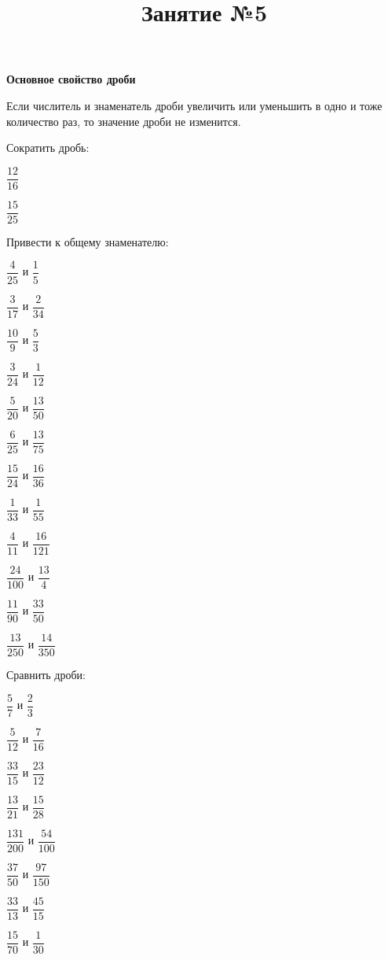 %
\newpage
\title{Занятие №5}
\begin{listofex}
	\item \textbf{Основное свойство дроби}
	
	Если числитель и знаменатель дроби увеличить или уменьшить в одно и тоже количество раз, то значение дроби не изменится.
	\item Сократить дробь:
	\begin{enumcols}[itemcolumns=4]
		\item \( \dfrac{12}{16} \)
		\item \( \dfrac{15}{25} \)
	\end{enumcols}
	\item Привести к общему знаменателю:
	\begin{enumcols}[itemcolumns=4]
		\item \( \dfrac{4}{25} \) и \( \dfrac{1}{5} \)
		\item \( \dfrac{3}{17} \) и \( \dfrac{2}{34} \)
		\item \( \dfrac{10}{9} \) и \( \dfrac{5}{3} \)
		\item \( \dfrac{3}{24} \) и \( \dfrac{1}{12} \)
		\item \( \dfrac{5}{20} \) и \( \dfrac{13}{50} \)
		\item \( \dfrac{6}{25} \) и \( \dfrac{13}{75} \)
		\item \( \dfrac{15}{24} \) и \( \dfrac{16}{36} \)
		\item \( \dfrac{1}{33} \) и \( \dfrac{1}{55} \)
		\item \( \dfrac{4}{11} \) и \( \dfrac{16}{121} \)
		\item \( \dfrac{24}{100} \) и \( \dfrac{13}{4} \)
		\item \( \dfrac{11}{90} \) и \( \dfrac{33}{50} \)
		\item \( \dfrac{13}{250} \) и \( \dfrac{14}{350} \)
	\end{enumcols}
	\item Сравнить дроби:
	\begin{enumcols}[itemcolumns=4]
		\item \( \dfrac{5}{7} \) и \( \dfrac{2}{3} \)
		\item \( \dfrac{5}{12} \) и \( \dfrac{7}{16} \)
		\item \( \dfrac{33}{15} \) и \( \dfrac{23}{12} \)
		\item \( \dfrac{13}{21} \) и \( \dfrac{15}{28} \)
		\item \( \dfrac{131}{200} \) и \( \dfrac{54}{100} \)
		\item \( \dfrac{37}{50} \) и \( \dfrac{97}{150} \)
		\item \( \dfrac{33}{13} \) и \( \dfrac{45}{15} \)
		\item \( \dfrac{15}{70} \) и \( \dfrac{1}{30} \)
	\end{enumcols}
\end{listofex}
